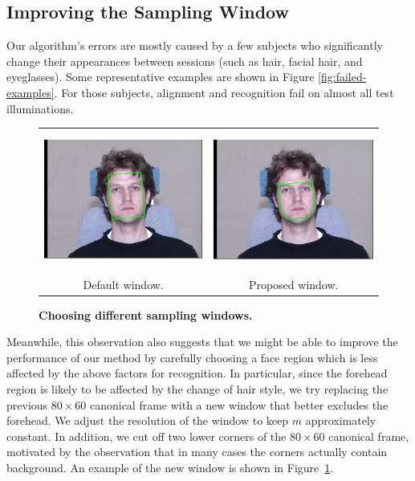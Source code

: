 \subsection{Improving the Sampling Window}
Our algorithm's errors are mostly caused by a few subjects who
significantly change their appearances between sessions (such
as hair, facial hair, and eyeglasses). Some representative
examples are shown in Figure \ref{fig:failed-examples}. For those subjects, alignment and recognition fail on
almost all test illuminations.
\begin{figure}[b]
\centering
{
\begin{tabular}{@{}cc@{}}
\includegraphics[trim=1.9in .7in 1.9in .5in, clip, height=1.8in]{figures_pami/example.png} &
\includegraphics[trim=1.9in .7in 1.9in .5in, clip, height=1.8in]{figures_pami/example_new.png} \\
Default window. & Proposed window.
\end{tabular}
}
\caption{\small{\bf Choosing different sampling windows.}}
\label{fig:new-mask}
\end{figure}
Meanwhile, this observation also suggests that we might be able
to improve the performance of our method by carefully choosing
a face region which is less affected by the above factors for
recognition. In particular, since the forehead region is likely
to be affected by the change of hair style, we try replacing
the previous $80 \times 60$ canonical frame with a new
window that better excludes the forehead. We adjust the
resolution of the window to keep $m$ approximately constant. In addition,
we cut off two lower corners of the $80 \times 60$ canonical frame, motivated by
the observation that in many cases the corners
actually contain background. An example of the new window
is shown in Figure~\ref{fig:new-mask}.


